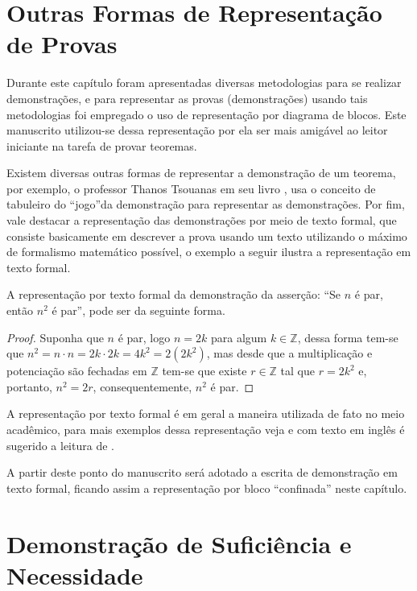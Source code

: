 \section{Outras Formas de Representação de Provas}\label{sec:OutrasFormasProvas}

Durante este capítulo foram apresentadas diversas metodologias para se realizar demonstrações, e para representar as provas (demonstrações) usando tais metodologias foi empregado o uso de representação por diagrama de blocos. Este manuscrito utilizou-se dessa representação por ela ser mais amigável ao leitor iniciante na tarefa de provar teoremas.

Existem diversas outras formas de representar a demonstração de um teorema, por exemplo, o professor Thanos Tsouanas em seu livro \cite{fmcbook}, usa o conceito de tabuleiro do ``jogo''da demonstração para representar as demonstrações. Por fim, vale destacar a representação das demonstrações por meio de texto formal, que consiste basicamente em descrever a prova usando um texto utilizando o máximo de formalismo matemático possível, o exemplo a seguir ilustra a representação em texto formal.

\begin{example}
	A representação por texto formal da demonstração da asserção: ``Se $n$ é par, então $n^2$ é par'', pode ser da seguinte forma.
	\begin{proof}
		Suponha que $n$ é par, logo $n = 2k$ para algum $k \in \mathbb{Z}$, dessa forma tem-se que $n^2 = n \cdot n = 2k \cdot 2k = 4k^2 = 2(2k^2)$, mas desde que a multiplicação e potenciação são fechadas em $\mathbb{Z}$ tem-se que existe $r \in \mathbb{Z}$ tal que $r = 2k^2$ e, portanto, $n^2 = 2r$, consequentemente,  $n^2$ é par.
	\end{proof}
\end{example}

A representação por texto formal é em geral a maneira utilizada de fato no meio acadêmico, para mais exemplos dessa representação veja \cite{valdi2016master, valdi2020phd, annax2019phd, thadeu2021phd, rui2019phd} e com texto em inglês é sugerido a leitura de \cite{vania2019phd}.

\begin{remark}
	A partir deste ponto do manuscrito será adotado a escrita de demonstração em texto formal, ficando assim a representação por bloco ``confinada'' neste capítulo.
\end{remark}

\section{Demonstração de Suficiência e Necessidade}

